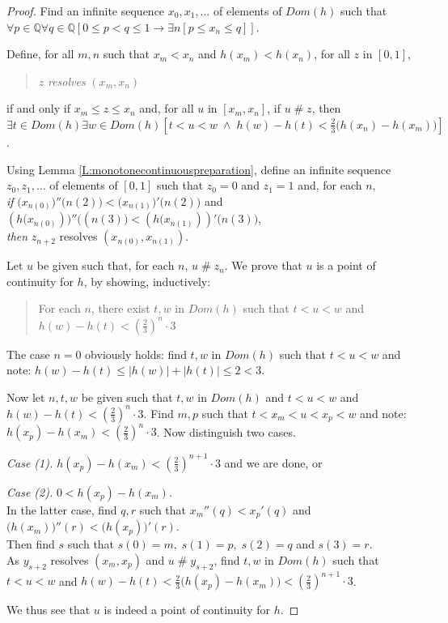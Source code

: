 \documentclass[a4paper]{amsart}
\theoremstyle{plain}
\begin{document}
 \begin{proof} Find an infinite sequence $x_0, x_1, \ldots$ of elements of $Dom(h)$ such that \\$\forall p \in \mathbb{Q} \forall q\in \mathbb{Q}[0\le p <q\le  1\rightarrow \exists n[p\le x_n\le q]]$. 
 
 Define, for all $m,n$ such that $x_m<x_n$ and $h(x_m)<h(x_n)$, for all $z$ in $[0,1]$, \begin{quote} $z$ \emph{resolves} $(x_m, x_n)$ \end{quote}if and only if $x_m\le z \le x_n$ and, for all $u$ in $[x_m, x_n]$, if $u\;\#\;z$, then \\$\exists t \in Dom(h)\exists w \in Dom(h)[t<u<w \;\wedge\; h(w)-h(t) < \frac{2}{3}\bigl(h(x_n)-h(x_m)\bigr)]$.
 
 
 Using Lemma \ref{L:monotonecontinuouspreparation},  define an infinite sequence $z_0, z_1, \ldots$ of elements of $[0,1]$ such that $z_0=0$ and $z_1=1$ and, for each $n$, \\{\it if} $\bigl(x_{n(0)})''\bigl(n(2)\bigr)<\bigl(x_{n(1)})'\bigl(n(2)\bigr)$ and  $(h\bigl(x_{n(0)}))''\bigl((n(3)\bigr) <(h\bigl(x_{n(1)}))'\bigl(n(3)\bigr)$, \\{\it then} $z_{n+2}$ resolves $(x_{n(0)}, x_{n(1)})$.  
 
 Let $u$ be given such that, for each $n$, $u\;\#\; z_n$. We prove that $u$ is a point of continuity for $h$, by showing, inductively:
  \begin{quote} For each $n$, there exist $t,w$ in $Dom(h)$ such that $t<u<w$ and $h(w)-h(t)<(\frac{2}{3})^n\cdot 3$ \end{quote}
 
 The case $n=0$ obviously holds: find $t,w$ in $Dom(h)$ such that $t<u<w$ and note: $h(w) -h(t)\le|h(w)|+|h(t)| \le 2<3$. 
 
 Now let $n, t,w$ be given such that $t,w$ in $Dom(h)$ and $t<u<w$ and \\$h(w) - h(t)<(\frac{2}{3})^n\cdot 3$. Find $m,p$ such that $t<x_m<u<x_p<w$ and note: $h(x_p) - h(x_m)<(\frac{2}{3})^n\cdot 3$. Now distinguish two cases. 
 
 \textit{Case (1). \it} $h(x_p) - h(x_m)<(\frac{2}{3})^{n+1}\cdot 3$ and  we are done, or
 
 {\it Case (2).} $0<h(x_p)-h(x_m)$. \\In the latter case,  find $q,r$ such that $x_m''(q)<x_p'(q)$ and $\bigl(h(x_m)\bigr)''(r) < \bigl(h(x_p)\bigr)'(r)$. \\Then find $s$ such that  $s(0) = m, \;s(1)= p, \;s(2) =q$ and $s(3)=r$. \\As $y_{s+2}$ resolves $(x_m, x_p)$ and $u\;\#\; y_{s+2}$,  find $t,w$ in $Dom(h)$ such that $t<u<w$ and $h(w)-h(t)<\frac{2}{3}\bigl(h(x_p)-h(x_m)\bigr)< (\frac{2}{3})^{n+1}\cdot 3$. 
 
 We thus see that $u$ is indeed a point of continuity for $h$.
 \end{proof}
 
\end{document}
